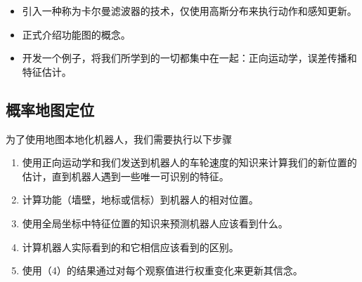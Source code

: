 \begin{itemize}

\item 引入一种称为卡尔曼滤波器的技术，仅使用高斯分布来执行动作和感知更新。
\item 正式介绍功能图的概念。
\item 开发一个例子，将我们所学到的一切都集中在一起：正向运动学，误差传播和特征估计。
\end{itemize}


\subsection{概率地图定位}
为了使用地图本地化机器人，我们需要执行以下步骤

\begin{enumerate}

\item 使用正向运动学和我们发送到机器人的车轮速度的知识来计算我们的新位置的估计，直到机器人遇到一些唯一可识别的特征。
\item 计算功能（墙壁，地标或信标）到机器人的相对位置。
\item 使用全局坐标中特征位置的知识来预测机器人应该看到什么。
\item 计算机器人实际看到的和它相信应该看到的区别。
\item 使用（4）的结果通过对每个观察值进行权重变化来更新其信念。
\end{enumerate}

